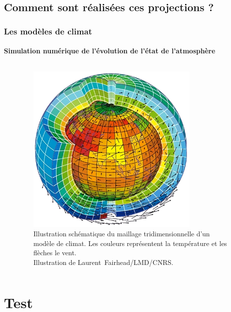 \documentclass[aspectratio=169, usepdftitle=false, xcolor={dvipsnames}, 9pt]{beamer}
\begin{document}
\subsection[Méthodologies]{Comment sont réalisées ces projections ?}
\makesubsecslide

\begin{frame}[c]
    \frametitle{Les modèles de climat}
    \framesubtitle{Simulation numérique de l'évolution de l'état de l'atmosphère}
    \begin{columns}
        \begin{column}{0.5\textwidth}
            
        \end{column}
        \begin{column}{0.5\textwidth}
            \begin{figure}[t]
                \centering
                \includegraphics[width=0.8\textwidth]{Figures/maillage_upscaled_x4_2.png}
                \caption{Illustration schématique du maillage tridimensionnelle d'un modèle de climat. Les couleurs représentent la température et les flèches
                le vent.\\Illustration de \mbox{Laurent Fairhead/LMD/CNRS}.}
            \end{figure}
        \end{column}
    \end{columns} 
\end{frame}

\section{Test}
\end{document}
